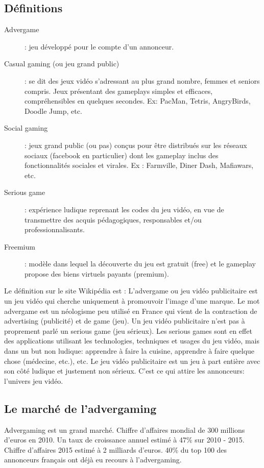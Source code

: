 \subsection{Définitions} %
\label{ssub:définitions}

\begin{description}
	\item[Advergame] : jeu développé pour le compte d’un annonceur.
	\item[Casual gaming (ou jeu grand public)] : se dit des jeux vidéo s'adressant au plus grand nombre, femmes et seniors compris. Jeux présentant des gameplays simples et efficaces, compréhensibles en quelques secondes. Ex: PacMan, Tetris, AngryBirds, Doodle Jump, etc.
	\item[Social gaming] : jeux grand public (ou pas) conçus pour être distribués sur les réseaux sociaux (facebook en particulier) dont les gameplay inclus des fonctionnalités sociales et virales. Ex : Farmville, Diner Dash, Mafiawars, etc.
	\item[Serious game] : expérience ludique reprenant les codes du jeu vidéo, en vue de transmettre des acquis pédagogiques, responsables et/ou professionnalisants.
	\item[Freemium] : modèle dans lequel la découverte du jeu est gratuit (free) et le gameplay propose des biens virtuels payants (premium).
\end{description}
Le définition sur le site Wikipédia est : L'advergame ou jeu vidéo publicitaire est un jeu vidéo qui cherche uniquement à promouvoir l'image d'une marque. Le mot advergame est un néologisme peu utilisé en France qui vient de la contraction de advertising (publicité) et de game (jeu). Un jeu vidéo publicitaire n'est pas à proprement parlé un serious game (jeu sérieux). Les serious games sont en effet des applications utilisant les technologies, techniques et usages du jeu vidéo, mais dans un but non ludique: apprendre à faire la cuisine, apprendre à faire quelque chose (médecine, etc.), etc.
Le jeu vidéo publicitaire est un jeu à part entière avec son côté ludique et justement non sérieux. C'est ce qui attire les annonceurs: l'univers jeu vidéo.


\subsection{Le marché de l'advergaming} %
\label{ssub:le_marché_de_l_advergame}

Advergaming est un grand marché. Chiffre d’affaires mondial de 300 millions d’euros en 2010. Un taux de croissance annuel estimé à 47\% sur 2010 - 2015. Chiffre d’affaires 2015 estimé à 2 milliards d’euros. 40\% du top 100 des annonceurs français ont déjà eu recours à l’advergaming.



